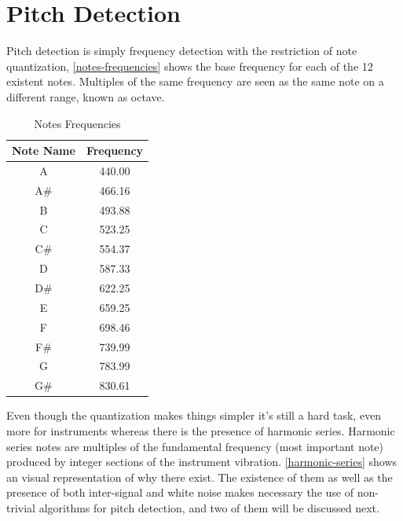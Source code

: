 \chapter{Pitch Detection}
\label{pitch-detection}

Pitch detection is simply frequency detection with the restriction of note quantization,
\autoref{notes-frequencies} shows the base frequency for each of the 12 existent
notes. Multiples of the same frequency are seen as the same note on a different
range, known as octave.

\begin{table}[htb]
  \begin{center}
    \ABNTEXreducedfont
    \caption[Notes Frequencies]{Notes Frequencies}
    \label{notes-frequencies}
    \begin{tabular}{c|c}
      \hline
      Note Name & Frequency\\
      \hline
      A & 440.00 \\
      A\# & 466.16 \\
      B & 493.88 \\
      C & 523.25 \\
      C\# & 554.37 \\
      D & 587.33 \\
      D\# & 622.25 \\
      E & 659.25 \\
      F & 698.46 \\
      F\# & 739.99 \\
      G & 783.99 \\
      G\# & 830.61 \\
      \hline
    \end{tabular}
  \end{center}
\end{table}

Even though the quantization makes things simpler it's still a hard task, even
more for instruments whereas there is the presence of harmonic series. Harmonic
series notes are multiples of the fundamental frequency (most important
note) produced by integer sections of the instrument vibration. \autoref{harmonic-series}
shows an visual representation of why there exist. The existence of them as well
as the presence of both inter-signal and white noise makes necessary the use of
non-trivial algorithms for pitch detection, and two of them will be discussed next.


